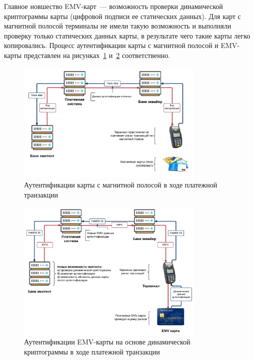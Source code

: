 Главное новшество EMV-карт~--- возможность проверки динамической криптограммы карты (цифровой подписи ее статических данных).
Для карт с магнитной полосой терминалы не имели такую возможность и выполняли проверку только статических данных карты, в результате чего такие карты легко копировались.
Процесс аутентификации карты с магнитной полосой и EMV-карты представлен на рисунках~\ref{fig:magnetic_card_auth} и~\ref{fig:emv_card_auth} соответственно.

\begin{figure}[H]
    \centering
    \includegraphics[width=0.8\textwidth]{images/research/magnetic_card_auth}
    \caption{\centering Аутентификации карты с магнитной полосой в ходе платежной транзакции}
    \label{fig:magnetic_card_auth}
\end{figure}

\begin{figure}
    \centering
    \includegraphics[width=0.8\textwidth]{images/research/emv_card_auth}
    \caption{\centering Аутентификации EMV-карты на основе динамической криптограммы в ходе платежной транзакции}
    \label{fig:emv_card_auth}
\end{figure}

